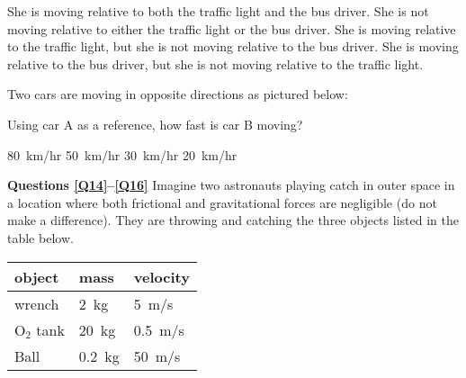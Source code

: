 \documentclass[]{exam}
\begin{document}
\begin{questions}
\begin{randomizechoices}[norandomize]
    \choice She is moving relative to both the traffic light and the bus driver.
    \choice She is not moving relative to either the traffic light or the bus driver.
    \correctchoice She is moving relative to the traffic light, but she is not moving relative to the bus driver.
    \choice She is moving relative to the bus driver, but she is not moving relative to the traffic light.
\end{randomizechoices}

\question
Two cars are moving in opposite directions as pictured below:

\begin{center}
\end{center}

Using car A as a reference, how fast is car B moving?

\begin{randomizeoneparchoices}[norandomize]
    \correctchoice \SI{80}{km/hr}
    \choice \SI{50}{km/hr}
    \choice \SI{30}{km/hr}
    \choice \SI{20}{km/hr}
\end{randomizeoneparchoices}

\begin{EnvUplevel}
    \textbf{Questions \ref{Q14}--\ref{Q16}} Imagine two astronauts playing catch in outer space in a location where both frictional and gravitational forces are negligible (do not make a difference). They are throwing and catching the three objects listed in the table below. 
\end{EnvUplevel}

\begin{center}
    \begin{tabular}{|l|l|l|}
        \hline
        \textbf{object} & \textbf{mass} & \textbf{velocity} \\ \hline
        wrench & \SI{2}{kg} & \SI{5}{m/s} \\ \hline
        $\mathrm{O}_2$ tank & \SI{20}{kg} & \SI{0.5}{m/s}\\ \hline
        Ball & \SI{0.2}{kg} & \SI{50}{m/s}\\ \hline
    \end{tabular}
\end{center}


\end{questions}
\end{document}
